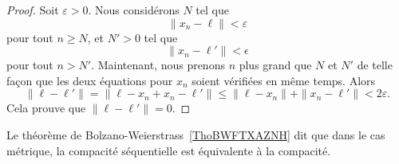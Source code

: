 \begin{proof}
	Soit $\varepsilon>0$. Nous considérons $N$ tel que
	\begin{equation}
		\| x_n-\ell \|<\varepsilon
	\end{equation}
	pour tout $n\geq N$, et $N'>0$ tel que
	\begin{equation}
		\| x_n-\ell' \|<\epsilon
	\end{equation}
	pour tout $n>N'$. Maintenant, nous prenons $n$ plus grand que $N$ et $N'$ de telle façon que les deux équations pour $x_n$ soient vérifiées en même temps. Alors
	\begin{equation}
		\| \ell-\ell' \|=\| \ell-x_n+x_n-\ell' \|\leq\| \ell-x_n \|+\| x_n-\ell' \|<2\varepsilon.
	\end{equation}
	Cela prouve que $\| \ell-\ell' \|=0$.
\end{proof}
Le théorème de Bolzano-Weierstrass~\ref{ThoBWFTXAZNH} dit que dans le cas métrique, la compacité séquentielle est équivalente à la compacité.

